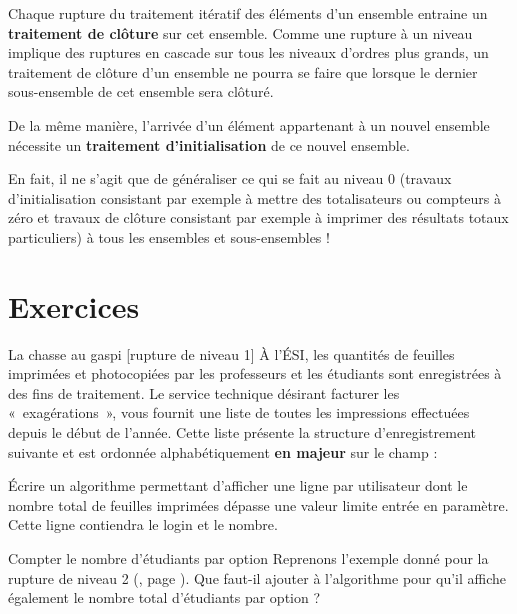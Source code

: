 	Chaque rupture du traitement itératif des éléments d’un ensemble
	entraine un \textbf{traitement de clôture} sur cet ensemble. Comme une
	rupture à un niveau implique des ruptures en cascade sur tous les
	niveaux d’ordres plus grands, un traitement de clôture d’un ensemble ne
	pourra se faire que lorsque le dernier sous-ensemble de cet ensemble
	sera clôturé.
	
	De la même manière, l’arrivée d’un élément appartenant à un nouvel
	ensemble nécessite un \textbf{traitement d’initialisation} de ce nouvel
	ensemble.
	
	En fait, il ne s’agit que de généraliser ce qui se fait au niveau 0 
	(travaux d’initialisation consistant par exemple à mettre des totalisateurs 
	ou compteurs à zéro et travaux de clôture consistant par exemple 
	à imprimer des résultats totaux particuliers) 
	à tous les ensembles et sous-ensembles !
\section{Exercices}


\begin{Exercice}{La chasse au gaspi [rupture de niveau 1]}
	À l’ÉSI, les quantités de feuilles imprimées et photocopiées 
	par les professeurs et les étudiants sont enregistrées à des fins de traitement.
	Le service technique désirant facturer les «~exagérations~», 
	vous fournit une liste de toutes les impressions effectuées depuis le début de l'année.
	Cette liste présente la structure d’enregistrement  suivante 
	et est ordonnée alphabétiquement \textbf{en majeur} sur le champ   :

	\begin{LDA}
		\EndStruct
	\end{LDA}

	Écrire un algorithme permettant d'afficher une ligne par
	utilisateur dont le nombre total de feuilles imprimées dépasse une
	valeur limite entrée en paramètre. 
	Cette ligne contiendra le login et le nombre.
\end{Exercice}

\begin{Exercice}{Compter le nombre d'étudiants par option}
	Reprenons l'exemple donné pour la rupture de niveau 2 (, page \pageref{algo:rupt2}).
	Que faut-il ajouter à l'algorithme pour qu'il affiche également 
	le nombre total d'étudiants par option ?
\end{Exercice}

